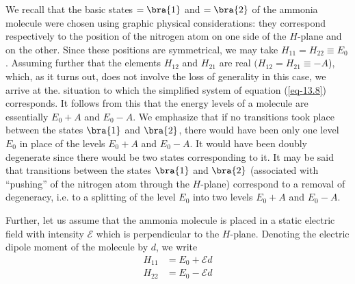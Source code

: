 \documentclass[a4paper,sfsidenotes,colorlinks=true]{tufte-book}
\numberwithin{equation}{section}
\numberwithin{figure}{section}
\newcommand{\Ea}{\mathcal{E}}
\begin{document}
We recall that the basic
states $=\bra{1}$ and $=\bra{2}$ of the ammonia molecule were chosen
using graphic physical considerations: they correspond respectively to
the position of the nitrogen atom on one side of the $H$-plane and on
the other. Since these positions are symmetrical, we may take $H_{11}
= H_{22} \equiv E_{0}$. Assuming further that the elements $H_{12}$
and $H_{21}$ are real $(H_{12}= H_{21} \equiv -A$), which, as it turns
out, does not involve the loss of generality in this case, we arrive
at the. situation to which the simplified system of equation
(\ref{eq-13.8}) corresponds. It follows from this that the energy
levels of a molecule are essentially $E_{0} + A$ and $E_{0} - A$. We
emphasize that if no transitions took place between the states
$\bra{1}$ and $\bra{2}$, there would have been only one level $E_{0}$
in place of the levels $E_{0} + A$ and $E_{0} - A$. It would have been
doubly degenerate since there would be two states corresponding to
it. It may be said that transitions between the states $\bra{1}$ and $\bra{2}$
(associated with ``pushing'' of the nitrogen atom through the $H$-plane)
correspond to a removal of degeneracy, i.e. to a splitting of the level
$E_{0}$ into two levels $E_{0} + A$ and $E_{0} - A$.
     

Further, let us assume that the ammonia molecule is placed in a static
electric field with intensity $\Ea$ which is perpendicular to the
$H$-plane. Denoting the electric dipole moment of the molecule by $d$,
we write
\begin{equation}%
\begin{split}
H_{11}& = E_{0} + \Ea d \\
H_{22} & = E_{0} - \Ea d
\end{split}
\label{eq-13.17}
\end{equation}
\end{document}
